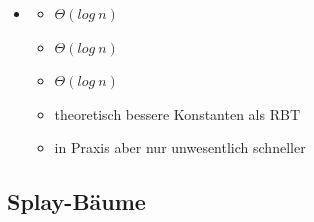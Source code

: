 \documentclass[
    12pt,
    a4paper,
    ngerman,
    color=3b,%
    marginpar=false,
    colorback=false,
    leqno,
]{tudaexercise}
\begin{document}
\begin{itemize}
        \item {}
            \begin{itemize}
                \item {} $\Theta(log~n)$
                \item {} $\Theta(log~n)$
                \item {} $\Theta(log~n)$
                \item theoretisch bessere Konstanten als RBT
                \item in Praxis aber nur unwesentlich schneller
            \end{itemize}
    \end{itemize}
    \clearpage
    \subsection{Splay-Bäume}\label{Splay-Baeume}
\end{document}
